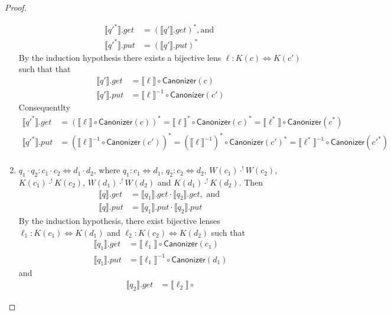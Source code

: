 \documentclass{svproc}
\newcommand{\kw}[1]{\ensuremath{\mathsf{#1}}}
\newcommand{\canonizer}{\ensuremath{\kw{Canonizer}}}
\begin{document}
\begin{proof}
\begin{enumerate}
  \begin{align*}
  \llbracket {q'}^* \rrbracket.get &= (\llbracket q' \rrbracket.get)^*, \text{
  and }\\
  \llbracket {q'}^* \rrbracket.put &= (\llbracket q' \rrbracket.put)^*
  \end{align*}
  By the induction hypothesis there exists a bijective lens $\ell : K(c)
  \Leftrightarrow K(c')$ such that 
   that
  \begin{align*}
\llbracket q' \rrbracket.get &= \llbracket \ell \rrbracket \circ
\canonizer(c)\\
\llbracket q' \rrbracket.put &= {\llbracket \ell \rrbracket}^{-1} \circ
\canonizer(c')
\end{align*}
Consequentlty
\begin{align*}
\llbracket {q'}^* \rrbracket.get &= (\llbracket \ell \rrbracket \circ
\canonizer(c))^* = \llbracket \ell \rrbracket^* \circ
\canonizer(c)^* = \llbracket \ell^* \rrbracket \circ
\canonizer(c^*)\\
\llbracket {q'}^* \rrbracket.put &= (\llbracket \ell \rrbracket^{-1} \circ
\canonizer(c'))^* = (\llbracket \ell \rrbracket^{-1})^* \circ
\canonizer(c')^* = \llbracket \ell^* \rrbracket^{-1} \circ
\canonizer(c'^*)\\
\end{align*}
\item
  $q_1 \cdot q_2: c_1 \cdot c_2 \Leftrightarrow d_1 \cdot d_2$, where $q_1 : c_1
  \Leftrightarrow d_1 $,  $q_2 : c_2 \Leftrightarrow d_2$, $W(c_1)
  \cdot^! W(c_2)$, $K(c_1) \cdot^! K(c_2)$, $W(d_1) \cdot^! W(d_2)$ and $
  K(d_1) \cdot^! K(d_2)$. Then
  \begin{align*}
  \llbracket q \rrbracket.get &= \llbracket q_1 \rrbracket.get \cdot \llbracket
  q_2 \rrbracket.get, \text{ and }\\
  \llbracket q \rrbracket.put &= \llbracket q_1 \rrbracket.put \cdot \llbracket
  q_2 \rrbracket.put
  \end{align*}
By the induction hypothesis, there exist bijective lenses $\ell_1 : K(c_1)
\Leftrightarrow K(d_1)$ and $\ell_2 : K(c_2) \Leftrightarrow K(d_2)$ such that
\begin{align*}
\llbracket q_1 \rrbracket.get &= \llbracket \ell_1 \rrbracket \circ
\canonizer(c_1)\\
\llbracket q_1 \rrbracket.put &= {\llbracket \ell_1 \rrbracket}^{-1} \circ
\canonizer(d_1)
\end{align*}
and
\begin{align*}
\llbracket q_2 \rrbracket.get &= \llbracket \ell_2 \rrbracket \circ

\end{align*}
\end{enumerate}
\end{proof}
\end{document}
